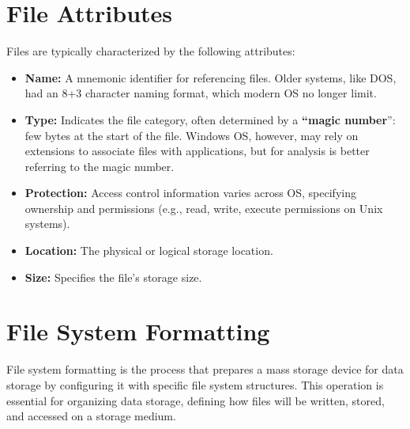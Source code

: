 \section{File Attributes}

Files are typically characterized by the following attributes:
\begin{itemize}
    \item \textbf{Name:} A mnemonic identifier for referencing files. Older systems, like DOS, had an 8+3 character naming format, which modern OS no longer limit.
    \item \textbf{Type:} Indicates the file category, often determined by a \textbf{“magic number}”: few bytes at the start of the file. Windows OS, however, may rely on extensions to associate files with applications, but for analysis is better referring to the magic number. 
    \item \textbf{Protection:} Access control information varies across OS, specifying ownership and permissions (e.g., read, write, execute permissions on Unix systems).
    \item \textbf{Location:} The physical or logical storage location.
    \item \textbf{Size:} Specifies the file’s storage size.
\end{itemize}

\section{File System Formatting}

File system formatting is the process that prepares a mass storage device for data storage by configuring it with specific file system structures. This operation is essential for organizing data storage, defining how files will be written, stored, and accessed on a storage medium.

